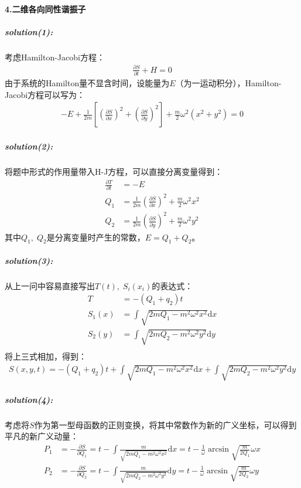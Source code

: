 \documentclass[a4paper]{ctexart}
\def\d{\mathrm{d}}
\begin{document}
    \paragraph{4.二维各向同性谐振子}
    \subparagraph{solution(1):}
    考虑Hamilton-Jacobi方程：
    \begin{align}
        \frac{\partial S}{\partial t}  + H = 0
    \end{align}
    由于系统的Hamilton量不显含时间，设能量为$E$（为一运动积分），Hamilton-Jacobi方程可以写为：
    \begin{align}
        -E + \frac{1}{2m}\left[\left(\frac{\partial S}{\partial x}\right)^{2} + \left(\frac{\partial S}{\partial y}\right)^{2}\right] + \frac{m}{2}\omega^{2}(x^{2} + y^{2}) = 0
    \end{align}
    \subparagraph{solution(2):}
    将题中形式的作用量带入H-J方程，可以直接分离变量得到：
    \begin{align}
        \frac{\partial T}{\partial t} &= -E\\
        Q_{1} &= \frac{1}{2m}\left(\frac{\partial S}{\partial x}\right)^{2} + \frac{m}{2}\omega^{2}x^{2}\\
        Q_{2} &= \frac{1}{2m}\left(\frac{\partial S}{\partial y}\right)^{2} + \frac{m}{2}\omega^{2}y^{2}
    \end{align}
    其中$Q_{1},\;Q_{2}$是分离变量时产生的常数，$E = Q_{1}+Q_{2}$。
    \subparagraph{solution(3):}
    从上一问中容易直接写出$T(t),\;S_{i}(x_{i})$的表达式：
    \begin{align}
        T &= -(Q_{1} + q_{2})t\\
        S_{1}(x) &= \int\sqrt{2mQ_{1} - m^{2}\omega^{2}x^{2}}\d x\\
        S_{2}(y) &= \int\sqrt{2mQ_{2} - m^{2}\omega^{2}y^{2}}\d y\\
    \end{align}
    将上三式相加，得到：
    \begin{align}
        S(x, y, t) = -(Q_{1} + q_{2})t + \int\sqrt{2mQ_{1} - m^{2}\omega^{2}x^{2}}\d x + \int\sqrt{2mQ_{2} - m^{2}\omega^{2}y^{2}}\d y
    \end{align}
    \subparagraph{solution(4):}
    考虑将$S$作为第一型母函数的正则变换，将其中常数作为新的广义坐标，可以得到平凡的新广义动量：
    \begin{align}
        P_{1} &= -\frac{\partial S}{\partial Q_{1}} = t - \int\frac{m}{\sqrt{2mQ_{1} - m^{2}\omega^{2}x^{2}}}\d x = t - \frac{1}{\omega}\arcsin\sqrt{\frac{m}{2Q_{1}}}\omega x\\
        P_{2} &= -\frac{\partial S}{\partial Q_{2}} = t - \int\frac{m}{\sqrt{2mQ_{2} - m^{2}\omega^{2}y^{2}}}\d y = t - \frac{1}{\omega}\arcsin\sqrt{\frac{m}{2Q_{2}}}\omega y
    \end{align}
\end{document}
